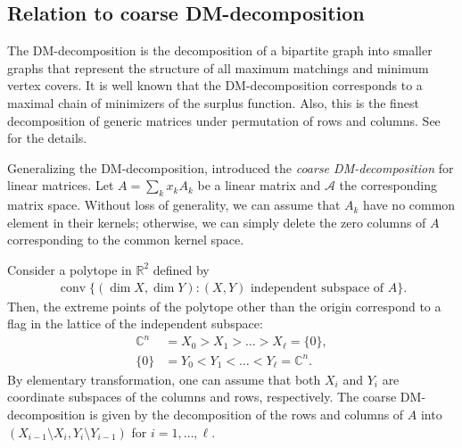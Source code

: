 \documentclass[a4paper,11pt]{article}
\numberwithin{equation}{section}
\newcommand{\C}{\mathbb{C}}
\newcommand{\R}{\mathbb{R}}
\newcommand{\caA}{\mathcal{A}}
\DeclareMathOperator{\conv}{conv}
\begin{document}
\subsection{Relation to coarse DM-decomposition}\label{subsec:coarse-DM}
The DM-decomposition is the decomposition of a bipartite graph into smaller graphs that represent the structure of all maximum matchings and minimum vertex covers.
It is well known that the DM-decomposition corresponds to a maximal chain of minimizers of the surplus function.
Also, this is the finest decomposition of generic matrices under permutation of rows and columns.
See \cite{Murota2009} for the details.

Generalizing the DM-decomposition, \citet{Hirai2024} introduced the \emph{coarse DM-decomposition} for linear matrices.
Let $A = \sum_k x_k A_k$ be a linear matrix and $\caA$ the corresponding matrix space.
Without loss of generality, we can assume that $A_k$ have no common element in their kernels;
otherwise, we can simply delete the zero columns of $A$ corresponding to the common kernel space.

Consider a polytope in $\R^2$ defined by 
\begin{align}
    \conv\{(\dim X, \dim Y) : \text{$(X, Y)$ independent subspace of $A$} \}.
\end{align}
Then, the extreme points of the polytope other than the origin correspond to a flag in the lattice of the independent subspace:
\begin{align}
    \C^n  &= X_0 > X_1 > \dots > X_\ell = \{0\}, \\
    \{0\} &= Y_0 < Y_1 < \dots < Y_\ell = \C^n.
\end{align}
By elementary transformation, one can assume that both $X_i$ and $Y_i$ are coordinate subspaces of the columns and rows, respectively.
The coarse DM-decomposition is given by the decomposition of the rows and columns of $A$ into 
$
    (X_{i-1} \setminus X_i, Y_i \setminus Y_{i-1})
$
for $i = 1, \dots, \ell$.
 
\end{document}
